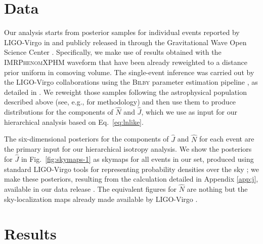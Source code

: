 \documentclass[aps,prd,twocolumn,superscriptaddress,preprintnumbers,floatfix,nofootinbib]{revtex4-2}
\begin{document}
\section{Data}
\label{sec:data}

Our analysis starts from posterior samples for individual events reported by LIGO-Virgo in \cite{LIGOScientific:2021djp,LIGOScientific:2021usb} and publicly released in \cite{zenodo:GWTC-2.1,zenodo:GWTC-3} through the Gravitational Wave Open Science Center \cite{GWOSC:GWTC-2.1,GWOSC:GWTC-3,LIGOScientific:2019lzm}.
Specifically, we make use of results obtained with the \textsc{IMRPhenomXPHM} waveform \cite{Pratten:2020ceb,Pratten:2020fqn,Garcia-Quiros:2020qpx,Garcia-Quiros:2020qlt} that have been already reweighted to a distance prior uniform in comoving volume.
The single-event inference was carried out by the LIGO-Virgo collaborations using the \textsc{Bilby} parameter estimation pipeline \cite{Romero-Shaw:2020owr,Ashton:2018jfp}, as detailed in \cite{LIGOScientific:2021djp,LIGOScientific:2021usb}.
We reweight those samples following the astrophysical population described above (see, e.g., \cite{Miller:2020zox,Essick:2022ojx} for methodology) and then use them to produce distributions for the components of $\hat{N}$ and $\hat{J}$, which we use as input for our hierarchical analysis based on Eq.~\eqref{eq:lnlike}.

\setlength{\tabcolsep}{4pt}

The six-dimensional posteriors for the components of $\hat{J}$ and $\hat{N}$ for each event are the primary input for our hierarchical isotropy analysis.
We show the posteriors for $\hat{J}$ in Fig.~\ref{fig:skymaps-1} as skymaps for all events in our set, produced using standard LIGO-Virgo tools for representing probability densities over the sky \cite{skymap,Singer:2016eax,Singer:2016erz}; we make these posteriors, resulting from the calculation detailed in Appendix \ref{app:j}, available in our data release \cite{repo}.
The equivalent figures for $\hat{N}$ are nothing but the sky-localization maps already made available by LIGO-Virgo \cite{zenodo:GWTC-2.1,zenodo:GWTC-3}.

\section{Results}
\label{sec:results}
\end{document}
